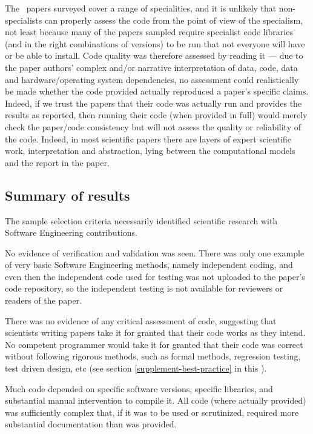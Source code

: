 \documentclass[10pt,a4paper]{article}
\begin{document}
The \the\dataN\ papers surveyed cover a range of specialities, and it is unlikely that non-specialists can properly assess the code from the point of view of the specialism, not least because many of the papers sampled require specialist code libraries (and in the right combinations of versions) to be run that not everyone will have or be able to install. Code quality was therefore assessed by reading it --- due to the paper authors' complex and/or narrative interpretation of data, code, data and hardware/operating system dependencies, no assessment could realistically be made whether the code provided actually reproduced a paper's specific claims. Indeed, if we trust the papers that their code was actually run and provides the results as reported, then running their code (when provided in full) would merely check the paper/code consistency but will not assess the quality or reliability of the code. Indeed, in most scientific papers there are layers of expert scientific work, interpretation and abstraction, lying between the computational models and the report in the paper.

\subsection{Summary of results}
\label{supplement-summary-of-results}
The sample selection criteria necessarily identified scientific research with Software Engineering contributions. 

No evidence of verification and validation was seen. There was only one example of very basic Software Engineering methods, namely independent coding, and even then the independent code used for testing was not uploaded to the paper's code repository, so the independent testing is not available for reviewers or readers of the paper.

There was no evidence of any critical assessment of code, suggesting that scientists writing papers take it for granted that their code works as they intend. No competent programmer would take it for granted that their code was correct without following rigorous methods, such as formal methods, regression testing, test driven design, etc (see section \ref{supplement-best-practice} in this \supplement).

Much code depended on specific software versions, specific libraries, and substantial manual intervention to compile it. All code (where actually provided) was sufficiently complex that, if it was to be used or scrutinized, required more substantial documentation than was provided.
\end{document}

